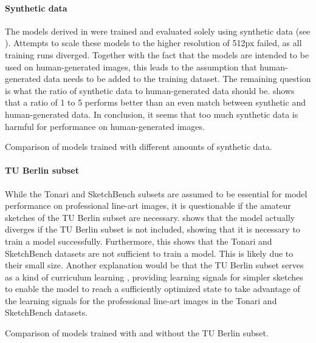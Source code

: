 \paragraph{Synthetic data}
\label{p:ablation.synthetic}

The models derived in  were trained and evaluated solely using synthetic data (see ). Attempts to scale these models to the higher resolution of 512px failed, as all training runs diverged. Together with the fact that the models are intended to be used on human-generated images, this leads to the assumption that human-generated data needs to be added to the training dataset. The remaining question is what the ratio of synthetic data to human-generated data should be.  shows that a ratio of 1 to 5 performs better than an even match between synthetic and human-generated data. In conclusion, it seems that too much synthetic data is harmful for performance on human-generated images.

\begin{table}[]
    \centering

    \caption{Comparison of models trained with different amounts of synthetic data.}
    \label{tab:versions-synthetic-data-ratio}
\end{table}

\paragraph{TU Berlin subset}

While the Tonari and SketchBench subsets are assumed to be essential for model performance on professional line-art images, it is questionable if the amateur sketches of the TU Berlin subset are necessary.  shows that the model actually diverges if the TU Berlin subset is not included, showing that it is necessary to train a model successfully. Furthermore, this shows that the Tonari and SketchBench datasets are not sufficient to train a model. This is likely due to their small size. Another explanation would be that the TU Berlin subset serves as a kind of curriculum learning \citep{10.1145/1553374.1553380}, providing learning signals for simpler sketches to enable the model to reach a sufficiently optimized state to take advantage of the learning signals for the professional line-art images in the Tonari and SketchBench datasets.

\begin{table}[]
    \centering

    \caption{Comparison of models trained with and without the TU Berlin subset.}
    \label{tab:versions-TU-Berlin-subset}
\end{table}

